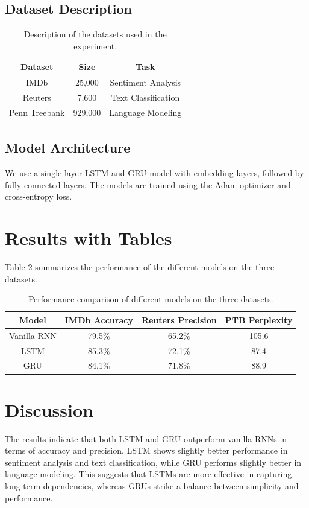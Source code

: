 \documentclass{article}
\begin{document}
\subsection{Dataset Description}
\begin{table}[ht]
\centering
\begin{tabular}{|c|c|c|}
\hline
\textbf{Dataset} & \textbf{Size} & \textbf{Task} \\
\hline
IMDb & 25,000 & Sentiment Analysis \\
Reuters & 7,600 & Text Classification \\
Penn Treebank & 929,000 & Language Modeling \\
\hline
\end{tabular}
\caption{Description of the datasets used in the experiment.}
\label{tab:dataset}
\end{table}

\subsection{Model Architecture}
We use a single-layer LSTM and GRU model with embedding layers, followed by fully connected layers. The models are trained using the Adam optimizer and cross-entropy loss.

\section{Results with Tables}
Table \ref{tab:results} summarizes the performance of the different models on the three datasets.

\begin{table}[ht]
\centering
\begin{tabular}{|c|c|c|c|}
\hline
\textbf{Model} & \textbf{IMDb Accuracy} & \textbf{Reuters Precision} & \textbf{PTB Perplexity} \\
\hline
Vanilla RNN & 79.5\% & 65.2\% & 105.6 \\
LSTM & 85.3\% & 72.1\% & 87.4 \\
GRU & 84.1\% & 71.8\% & 88.9 \\
\hline
\end{tabular}
\caption{Performance comparison of different models on the three datasets.}
\label{tab:results}
\end{table}

\section{Discussion}
The results indicate that both LSTM and GRU outperform vanilla RNNs in terms of accuracy and precision. LSTM shows slightly better performance in sentiment analysis and text classification, while GRU performs slightly better in language modeling. This suggests that LSTMs are more effective in capturing long-term dependencies, whereas GRUs strike a balance between simplicity and performance.
\end{document}
